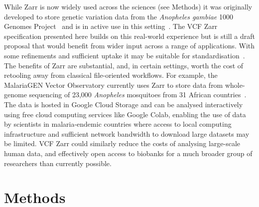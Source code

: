 \documentclass[a4paper,num-refs]{oup-contemporary}
\begin{document}
While Zarr is now widely used across the sciences (see Methods)
it was originally
developed to store genetic variation data from the
\textit{Anopheles gambiae}
1000 Genomes Project~\citep{anopheles2017genetic}
and is in active use in this
setting~\cite[e.g.][]{ahouidi2021open,trimarsanto2022molecular}.
The VCF Zarr specification presented here builds on this real-world
experience but is still a draft proposal that would benefit
from wider input across a range of applications. With some
refinements and sufficient uptake it may be suitable
for standardisation~\cite{rehm2021ga4gh}.
The benefits of Zarr are substantial, and, in certain settings,
worth the cost of retooling away from classical file-oriented workflows.
For example, the MalariaGEN Vector Observatory
currently uses Zarr to store data from whole-genome sequencing
of 23,000 \textit{Anopheles} mosquitoes from 31 African
countries~\cite{mvgo2024}.
The data is hosted in Google Cloud Storage and can be analysed interactively
using free cloud computing services like Google Colab,
enabling the use of data by scientists in malaria-endemic countries
where access to local computing infrastructure and sufficient network
bandwidth to download large datasets may be limited.
VCF Zarr could similarly reduce the costs of analysing large-scale
human data, and effectively open access to biobanks
for a much broader group of researchers than currently possible.


\section{Methods}
\end{document}
